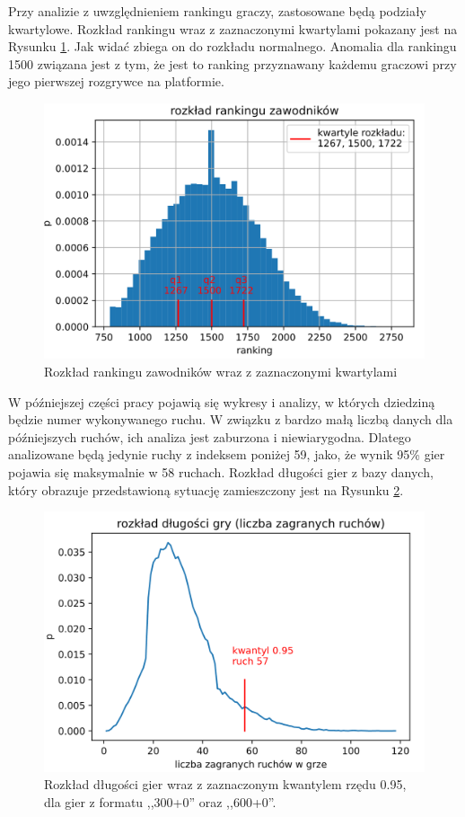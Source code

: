 \documentclass[inzynierska]{pwr_wmat_praca_dyplomowa}
\theoremstyle{plain}
\numberwithin{theorem}{chapter}
\theoremstyle{definition}
\numberwithin{theorem}{chapter}
\begin{document}
Przy analizie z uwzględnieniem rankingu graczy, zastosowane będą podziały kwartylowe. Rozkład rankingu wraz z zaznaczonymi kwartylami pokazany jest na Rysunku \ref{rys:rozklad_elo}. Jak widać zbiega on do rozkładu normalnego. Anomalia dla rankingu 1500 związana jest z tym, że jest to ranking przyznawany każdemu graczowi przy jego pierwszej rozgrywce na platformie.
\begin{figure}[H]
	\centering
	\includegraphics[width=\textwidth]{ranking.png}
	\caption{Rozkład rankingu zawodników wraz z zaznaczonymi kwartylami}
	\label{rys:rozklad_elo}
\end{figure}
W późniejszej części pracy pojawią się wykresy i analizy, w których dziedziną będzie numer wykonywanego ruchu. W związku z bardzo małą liczbą danych dla późniejszych ruchów, ich analiza jest zaburzona i niewiarygodna. Dlatego analizowane będą jedynie ruchy z indeksem poniżej 59, jako, że wynik 95\% gier pojawia się maksymalnie w 58 ruchach. Rozkład długości gier z bazy danych, który obrazuje przedstawioną sytuację zamieszczony jest na Rysunku \ref{rys:dlugosc_gier}.

\begin{figure}[h]
	\centering
	\includegraphics[width=\textwidth]{dlugosc_gry.png}
	\caption{Rozkład długości gier wraz z zaznaczonym kwantylem rzędu 0.95,  dla gier z formatu ,,300+0'' oraz ,,600+0''.}
	\label{rys:dlugosc_gier}
\end{figure}
\end{document}
